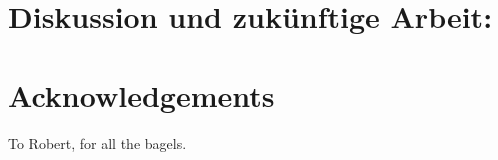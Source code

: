 \documentclass{acmsiggraph}
\begin{document}
\cite{Jobs95}
\section{Diskussion und zukünftige Arbeit:}



\section*{Acknowledgements}

To Robert, for all the bagels.


\nocite{*}

\end{document}
